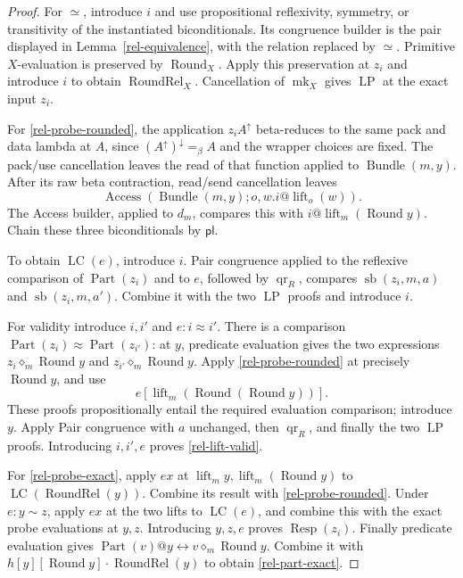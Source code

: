 \begin{proof}
For \(\simeq\), introduce \(i\) and use propositional
reflexivity, symmetry, or transitivity of the instantiated
biconditionals.  Its congruence builder is the pair displayed
in Lemma~\ref{rel-equivalence}, with the relation replaced by
\(\simeq\).  Primitive \(X\)-evaluation is preserved by
\(\operatorname{Round}_X\).  Apply this preservation at \(z_i\)
and introduce \(i\) to obtain \(\operatorname{RoundRel}_X\).
Cancellation of \(\operatorname{mk}_X\) gives \(\operatorname{LP}\)
at the exact input \(z_i\).

For \eqref{rel-probe-rounded}, the application \(z_iA^\uparrow\)
beta-reduces to the same pack and data lambda at \(A\), since
\((A^\uparrow)^\downarrow=_\beta A\) and the wrapper choices
are fixed.  The pack/use cancellation leaves the read of that
function applied to \(\operatorname{Bundle}(m,y)\).
After its raw beta contraction, read/send cancellation leaves
\[
 \operatorname{Access}
   (\operatorname{Bundle}(m,y);o,w.i@\operatorname{lift}_o(w)).
\]
The Access builder, applied to \(d_m\), compares this with
\(i@\operatorname{lift}_m(\operatorname{Round}y)\).
Chain these three biconditionals by \(\mathsf{pl}\).

To obtain \(\operatorname{LC}(e)\), introduce \(i\).
Pair congruence applied to the reflexive comparison of
\(\operatorname{Part}(z_i)\) and to \(e\), followed by
\(\operatorname{qr}_R\), compares \(\operatorname{sb}(z_i,m,a)\) and
\(\operatorname{sb}(z_i,m,a')\).  Combine it with the two \(\operatorname{LP}\)
proofs and introduce \(i\).

For validity introduce \(i,i'\) and \(e:i\approx i'\).
There is a comparison
\(\operatorname{Part}(z_i)\approx\operatorname{Part}(z_{i'})\):
at \(y\), predicate evaluation gives the two expressions
\(z_i\diamond_m\operatorname{Round}y\) and
\(z_{i'}\diamond_m\operatorname{Round}y\).
Apply \eqref{rel-probe-rounded} at precisely
\(\operatorname{Round}y\), and use
\[
 e[\operatorname{lift}_m
               (\operatorname{Round}(\operatorname{Round}y))].
\]
These proofs propositionally entail the required evaluation
comparison; introduce \(y\).  Apply Pair congruence with \(a\)
unchanged, then \(\operatorname{qr}_R\), and finally the two
\(\operatorname{LP}\) proofs.  Introducing \(i,i',e\) proves
\eqref{rel-lift-valid}.

For \eqref{rel-probe-exact}, apply \(ex\) at
\(\operatorname{lift}_m y,\operatorname{lift}_m(\operatorname{Round}y)\)
to \(\operatorname{LC}(\operatorname{RoundRel}(y))\).
Combine its result with \eqref{rel-probe-rounded}.  Under
\(e:y\sim z\), apply \(ex\) at the two lifts to
\(\operatorname{LC}(e)\), and combine this with the exact
probe evaluations at \(y,z\).  Introducing \(y,z,e\) proves
\(\operatorname{Resp}(z_i)\).
Finally predicate evaluation gives
\(\operatorname{Part}(v)@y\leftrightarrow
v\diamond_m\operatorname{Round}y\).
Combine it with \(h[y][\operatorname{Round}y]\cdot
\operatorname{RoundRel}(y)\) to obtain \eqref{rel-part-exact}.
\end{proof}

